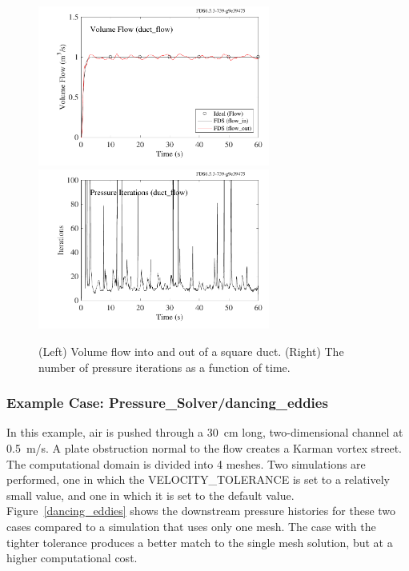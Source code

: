 \documentclass[11pt]{book}
\begin{document}
\begin{figure}[ht]
\begin{center}
\includegraphics[width=3in]{SCRIPT_FIGURES/duct_flow}
\includegraphics[width=3in]{SCRIPT_FIGURES/duct_flow_iterations}
\end{center}
\caption[Results of the {\ct duct\_flow} test case]{(Left) Volume flow into and out of a square duct. (Right) The number of pressure iterations as a function of time.}
\label{duct_flow}
\end{figure}


\subsubsection{Example Case: Pressure\_Solver/dancing\_eddies}

In this example, air is pushed through a 30~cm long, two-dimensional channel at 0.5~m/s. A plate obstruction normal to the flow creates a Karman vortex street. The computational domain is divided into 4 meshes. Two simulations are performed, one in which the {\ct VELOCITY\_TOLERANCE} is set to a relatively small value, and one in which it is set to the default value. Figure~\ref{dancing_eddies} shows the downstream pressure histories for these two cases compared to a simulation that uses only one mesh. The case with the tighter tolerance produces a better match to the single mesh solution, but at a higher computational cost.
\end{document}
